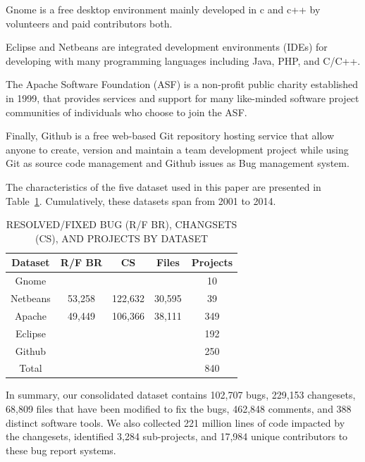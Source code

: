 \documentclass[conference]{IEEEtran}
\begin{document}
Gnome is a free desktop environment mainly developed in c and c++ by volunteers and paid contributors both.

Eclipse and Netbeans are integrated development environments (IDEs) for developing with many programming languages including Java, PHP, and C/C++.

The Apache Software Foundation (ASF) is a non-profit public charity established in 1999, that provides services and support for many like-minded software project communities of individuals who choose to join the ASF.

Finally, Github is a free web-based Git repository hosting service that allow anyone to create, version and maintain a team development project while using Git as source code management and Github issues as Bug management system.

The characteristics of the five dataset used in this paper are presented in Table~\ref{tab:summary}.
Cumulatively, these datasets span from 2001 to 2014.

\begin{table}[]
\centering
\caption{
RESOLVED/FIXED BUG (R/F BR),  CHANGSETS (CS), AND
PROJECTS BY DATASET}
\label{tab:summary}
\begin{tabular}{c|c|c|c|c}
\textbf{Dataset} & \textbf{R/F BR} & \textbf{CS} & \textbf{Files} & \textbf{Projects} \\ \hline \hline
Gnome            &                 &             &                & 10                \\ \hline
Netbeans         & 53,258          & 122,632     & 30,595         & 39                \\ \hline
Apache           & 49,449          & 106,366     & 38,111         & 349               \\ \hline
Eclipse          &                 &             &                & 192               \\ \hline
Github           &                 &             &                & 250               \\ \hline
Total            &                 &             &                & 840               \\ \hline \hline
\end{tabular}
\end{table}

In summary, our consolidated dataset contains 102,707 bugs, 229,153 changesets, 68,809 files that have been modified to fix the bugs, 462,848 comments, and 388 distinct software tools.
We also collected 221 million lines of code impacted by the changesets, identified 3,284 sub-projects, and 17,984 unique contributors to these bug report systems.
\end{document}
